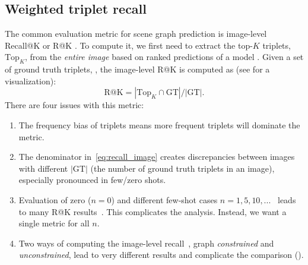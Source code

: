 \subsection{Weighted triplet recall}
\label{sec:metric}

The common evaluation metric for scene graph prediction is image-level Recall@K or R@K \citep{xu2017scene, yang2018graph, zellers2018neural}.
To compute it, we first need to extract the top-$K$ triplets, $\text{Top}_K$, from the \textit{entire image} based on ranked predictions of a model . Given a set of ground truth triplets, , the image-level R@K is computed as (see \fig{\ref{fig:eval}} for a visualization): 
\begin{equation}
\label{eq:recall_image}
\text{R}@\text{K} = {|\text{Top}_K \cap \text{GT}|}/{|\text{GT}|}.
\end{equation}
There are four issues with this metric:

\begin{enumerate}[label=(\alph*),wide, labelindent=0pt, leftmargin=0pt, listparindent=0pt, labelsep=3pt]
	\itemsep0em 
	\item The frequency bias of triplets means more frequent triplets will dominate the metric.
	\item The denominator in~\eqref{eq:recall_image} creates discrepancies between images with different $|\text{GT}|$ (the number of ground truth triplets in an image), especially pronounced in few/zero shots.
	\item Evaluation of zero ($n=0$) and different few-shot cases $n=1,5,10,...$~\citep{wang2019generating} leads to many R@K results~\citep{wang2019generating}. This complicates the analysis. Instead, we want a single metric for all $n$.
	\item Two ways of computing the image-level recall~\citep{newell2017pixels,zellers2018neural}, graph \textit{constrained} and \textit{unconstrained}, lead to very different results and complicate the comparison (\fig{\ref{fig:eval}}).%
\end{enumerate}

